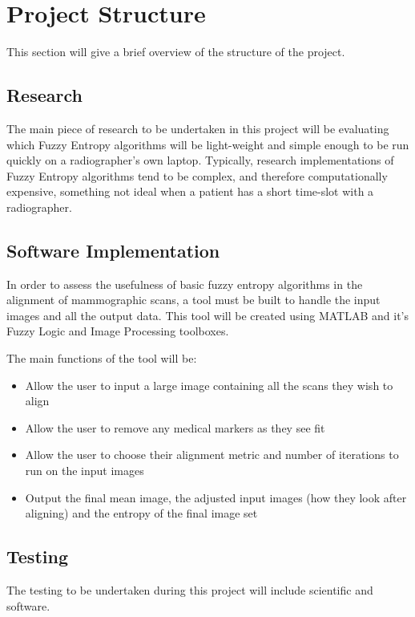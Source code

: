 \section{Project Structure}

This section will give a brief overview of the structure of the project.

\subsection{Research}

The main piece of research to be undertaken in this project will be evaluating which Fuzzy Entropy algorithms will be light-weight and simple enough to be run quickly on a radiographer's own laptop. Typically, research implementations of Fuzzy Entropy algorithms tend to be complex, and therefore computationally expensive, something not ideal when a patient has a short time-slot with a radiographer.

\subsection{Software Implementation}

In order to assess the usefulness of basic fuzzy entropy algorithms in the alignment of mammographic scans, a tool must be built to handle the input images and all the output data. This tool will be created using MATLAB and it's Fuzzy Logic and Image Processing toolboxes.

The main functions of the tool will be:

\begin{itemize}
  \item Allow the user to input a large image containing all the scans they wish to align
  \item Allow the user to remove any medical markers as they see fit
  \item Allow the user to choose their alignment metric and number of iterations to run on the input images
  \item Output the final mean image, the adjusted input images (how they look after aligning) and the entropy of the final image set
\end{itemize}

\subsection{Testing}

The testing to be undertaken during this project will include scientific and software.

